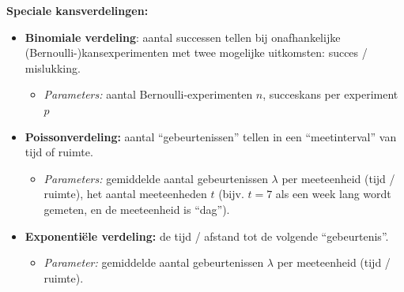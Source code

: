 \textbf{Speciale kansverdelingen:}
\begin{itemize}
    \item \textbf{Binomiale verdeling}: aantal successen tellen bij onafhankelijke (Bernoulli-)kansexperimenten met twee mogelijke uitkomsten: succes / mislukking.
    \begin{itemize}
        \item {\itshape Parameters:} aantal Bernoulli-experimenten $n$, succeskans per experiment $p$
    \end{itemize}
    
    \item \textbf{Poissonverdeling:} aantal \enquote{gebeurtenissen} tellen in een \enquote{meetinterval} van tijd of ruimte.
    \begin{itemize}
        \item {\itshape Parameters:} gemiddelde aantal gebeurtenissen $\lambda$ per meeteenheid (tijd / ruimte), het aantal meeteenheden $t$ (bijv. $t = 7$ als een week lang wordt gemeten, en de meeteenheid is \enquote{dag}).
    \end{itemize}

    \item \textbf{Exponentiële verdeling:} de tijd / afstand tot de volgende \enquote{gebeurtenis}.
    \begin{itemize}
        \item {\itshape Parameter:} gemiddelde aantal gebeurtenissen $\lambda$ per meeteenheid (tijd / ruimte).  
    \end{itemize}
\end{itemize}
\newpage
\vspace{-1cm}

